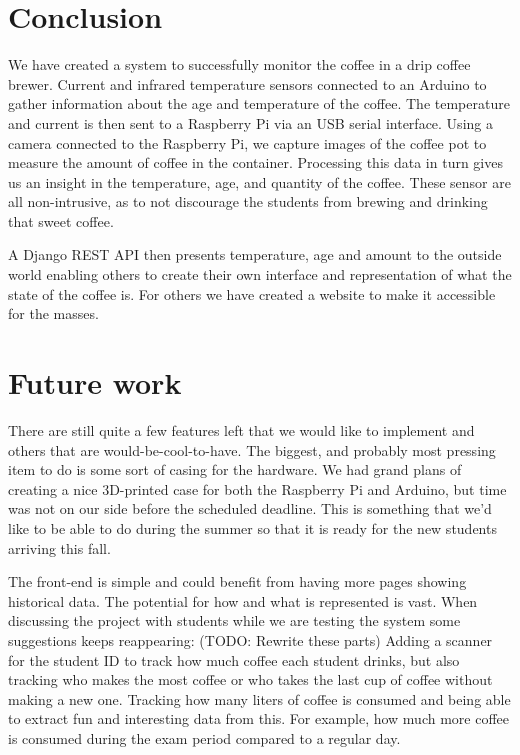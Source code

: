 \documentclass[12pt,a4paper,oneside,article]{memoir}
\numberwithin{equation}{chapter}
\begin{document}
\section{Conclusion}\label{sec:conclusion}
We have created a system to successfully monitor the coffee in a drip coffee 
brewer. Current and infrared temperature sensors connected to an Arduino to 
gather information about the age and temperature of the coffee. The 
temperature and current is then sent to a Raspberry Pi via an USB serial
interface. Using a camera connected to the Raspberry Pi, we capture images of 
the coffee pot to measure the amount of coffee in the container. Processing 
this data in turn gives us an insight in the temperature, age, and quantity of 
the coffee. These sensor are all non-intrusive, as to not discourage the 
students from brewing and drinking that sweet coffee.

A Django REST API then presents temperature, age and amount to the outside 
world enabling others to create their own interface and representation of what
the state of the coffee is. For others we have created a website to make it 
accessible for the masses.
 
\section{Future work}\label{sec:future-work}
There are still quite a few features left that we would like to implement and 
others that are would-be-cool-to-have. The biggest, and probably most pressing 
item to do is some sort of casing for the hardware. We had grand plans of 
creating a nice 3D-printed case for both the Raspberry Pi and Arduino, but time 
was not on our side before the scheduled deadline. This is something that we'd 
like to be able to do during the summer so that it is ready for the new 
students arriving this fall.

The front-end is simple and could benefit from having more pages showing
historical data. The potential for how and what is represented is vast. When 
discussing the project with students while we are testing the system some
suggestions keeps reappearing:
(TODO: Rewrite these parts)
Adding a scanner for the student ID to track how much coffee each student 
drinks, but also tracking who makes the most coffee or who takes the last cup 
of coffee without making a new one.
Tracking how many liters of coffee is consumed and being able to
extract fun and interesting data from this. For example, how much more
coffee is consumed during the exam period compared to a regular day.
\end{document}
